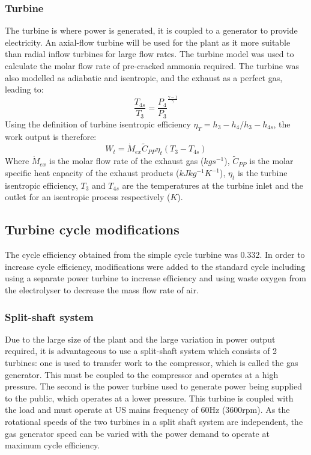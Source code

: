 \documentclass[11pt, oneside]{article}
\begin{document}
\subsubsection{Turbine} \label{ssec:turbine}
The turbine is where power is generated, it is coupled to a generator to provide electricity. An axial-flow turbine will be used for the plant as it more suitable than radial inflow turbines for large flow rates. The turbine model was used to calculate the molar flow rate of pre-cracked ammonia required. The turbine was also modelled as adiabatic and isentropic, and the exhaust as a perfect gas, leading to: 
\begin{equation}
\frac{T_{4s}}{T_{3}} = \frac{P_4}{P_3}^{\frac{\gamma -1}{\gamma}}
\end{equation}
Using the definition of turbine isentropic efficiency $\eta_T = {h_3 - h_4}/{h_3 - h_{4s}}$, the work output is therefore:
\begin{equation}
W_t = \dot{M}_{ex} \tilde{C}_{PP} \eta_t  (T_3 - T_{4s})
\end{equation}
Where $\dot{M}_{ex}$ is the molar flow rate of the exhaust gas ($kg s^{-1}$), $\tilde{C}_{PP}$ is the molar specific heat capacity of the exhaust products ($kJ kg^{-1} K^{-1}$), $\eta_t$ is the turbine isentropic efficiency, $T_3$ and $T_{4s}$ are the temperatures at the turbine inlet and the outlet for an isentropic process respectively ($K$). 

\subsection{Turbine cycle modifications }
The cycle efficiency obtained from the simple cycle turbine was 0.332. In order to increase cycle efficiency, modifications were added to the standard cycle including using a separate power turbine to increase efficiency and using waste oxygen from the electrolyser to decrease the mass flow rate of air. 

\subsubsection{Split-shaft system}
Due to the large size of the plant and the large variation in power output required, it is advantageous to use a split-shaft system which consists of 2 turbines: one is used to transfer work to the compressor, which is called the gas generator. This must be coupled to the compressor and operates at a high pressure. The second is the power turbine used to generate power being supplied to the public, which operates at a lower pressure. This turbine is coupled with the load and must operate at US mains frequency of 60Hz (3600rpm). As the rotational speeds of the two turbines in a split shaft system are independent, the gas generator speed can be varied with the power demand to operate at maximum cycle efficiency. \cite{thermonotes} %
\end{document}
